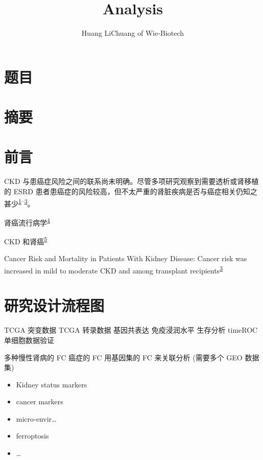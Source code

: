 \documentclass[
]{article}
\title{Analysis}
\author{Huang LiChuang of Wie-Biotech}
\date{}
\providecommand{\tightlist}{%
  \setlength{\itemsep}{0pt}\setlength{\parskip}{0pt}}
\begin{document}
\maketitle

{
\setcounter{tocdepth}{4}
\tableofcontents
}
\listoffigures

\listoftables

\hypertarget{ux9898ux76ee}{%
\section{题目}\label{ux9898ux76ee}}

\hypertarget{abstract}{%
\section{摘要}\label{abstract}}

\hypertarget{introduction}{%
\section{前言}\label{introduction}}

CKD 与患癌症风险之间的联系尚未明确。尽管多项研究观察到需要透析或肾移植的 ESRD 患者患癌症的风险较高，但不太严重的肾脏疾病是否与癌症相关仍知之甚少\textsuperscript{\protect\hyperlink{ref-OnconephrologyRosner2021}{1}--\protect\hyperlink{ref-CancerRiskAndKitchl2022}{3}}。

肾癌流行病学\textsuperscript{\protect\hyperlink{ref-EpidemiologyOfBukavi2022}{4}}

CKD 和肾癌\textsuperscript{\protect\hyperlink{ref-RenalCellCancSaly2021}{5}}

Cancer Risk and Mortality in Patients With Kidney Disease: Cancer risk was increased in mild to moderate CKD and among transplant recipients\textsuperscript{\protect\hyperlink{ref-CancerRiskAndKitchl2022}{3}}

\hypertarget{route}{%
\section{研究设计流程图}\label{route}}

TCGA 突变数据
TCGA 转录数据
基因共表达
免疫浸润水平
生存分析
timeROC
单细胞数据验证

多种慢性肾病的 FC
癌症的 FC
用基因集的 FC 来关联分析 (需要多个 GEO 数据集)

\begin{itemize}
\tightlist
\item
  Kidney status markers
\item
  cancer markers
\item
  micro-envir\ldots{}
\item
  ferroptosis
\item
  \ldots{}
\end{itemize}
\end{document}
